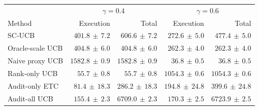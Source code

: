 \begin{tabular}{lrrrr}
\toprule
& \multicolumn{2}{c}{$\gamma=0.4$} & \multicolumn{2}{c}{$\gamma=0.6$} \\
Method & Execution & Total & Execution & Total \\
\midrule
SC-UCB & $401.8\,\pm\,7.2$ & $606.6\,\pm\,7.2$ & $272.6\,\pm\,5.0$ & $477.4\,\pm\,5.0$ \\
Oracle-scale UCB & $404.8\,\pm\,6.0$ & $404.8\,\pm\,6.0$ & $262.3\,\pm\,4.0$ & $262.3\,\pm\,4.0$ \\
Naive proxy UCB & $1582.8\,\pm\,0.9$ & $1582.8\,\pm\,0.9$ & $36.8\,\pm\,0.5$ & $36.8\,\pm\,0.5$ \\
Rank-only UCB & $55.7\,\pm\,0.8$ & $55.7\,\pm\,0.8$ & $1054.3\,\pm\,0.6$ & $1054.3\,\pm\,0.6$ \\
Audit-only ETC & $81.4\,\pm\,18.3$ & $286.2\,\pm\,18.3$ & $194.8\,\pm\,24.8$ & $399.6\,\pm\,24.8$ \\
Audit-all UCB & $155.4\,\pm\,2.3$ & $6709.0\,\pm\,2.3$ & $170.3\,\pm\,2.5$ & $6723.9\,\pm\,2.5$ \\
\bottomrule
\end{tabular}
